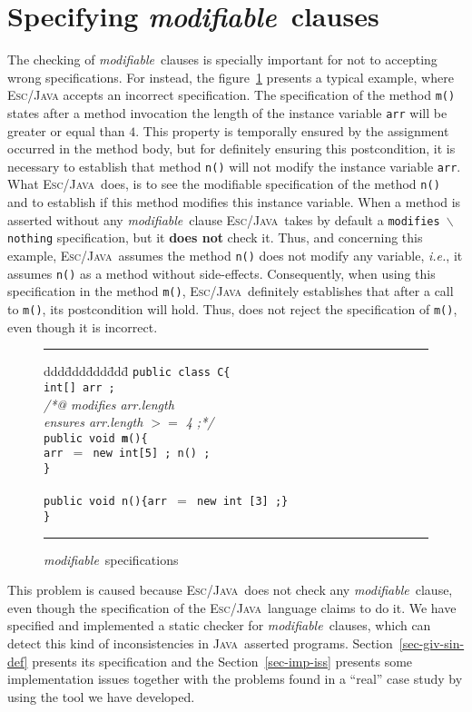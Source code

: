 \documentclass[a4paper]{llncs}
\newcommand{\escj}{\textsc{Esc/Java}}
\newcommand{\java}{\textsc{Java}}
\newcommand{\modif}{\textit{modifiable}}
\begin{document}
\section{Specifying \modif~clauses}
\label{sec-sem-mod-cla}
The checking of \modif~clauses is specially important for not to
accepting wrong specifications. For instead, the
figure~\ref{fig-mod-spe} presents a typical example, where \escj
accepts an incorrect specification. The specification of the method
\texttt{m()} states after a method invocation the length of the
instance variable \texttt{arr} will be greater or equal than $4$. This
property is temporally ensured by the assignment occurred in the
method body, but for definitely ensuring this postcondition, it is
necessary to establish that method \texttt{n()} will not modify the
instance variable \texttt{arr}. What \escj~does, is to see the
modifiable specification of the method \texttt{n()} and to establish
if this method modifies this instance variable. When a method is
asserted without any \modif~clause \escj~takes by default a
\texttt{modifies $\backslash$nothing} specification, but it {\bf does
not} check it. Thus, and concerning this example, \escj~assumes the
method \texttt{n()} does not modify any variable, \emph{i.e.}, it
assumes \texttt{n()} as a method without side-effects. Consequently,
when using this specification in the method \texttt{m()},
\escj~definitely establishes that after a call to \texttt{m()}, its
postcondition will hold. Thus, does not reject the specification of
\texttt{m()}, even though it is incorrect.
\begin{figure}[htb]
\rule{\linewidth}{0.25mm}
\begin{tabbing}
ddd\=ddd\=ddd\=ddd\= \kill 
\texttt{public class C\{} \\
\>\texttt{int[] arr ;} \\
\>\textsl{/*@ modifies arr.length}  \\
\>\>\textsl{ ensures arr.length $>=$ 4 ;*/} \\
\>\texttt{public void {\bf m}()\{} \\
\>\>\texttt{arr $=$ new int[5] ; n() ;} \\
\>\texttt{\}} \\
\\
\>\texttt{public void n()\{arr $=$ new int [3] ;\}} \\
\texttt{\}}
\end{tabbing}
\caption{\modif~specifications} 
\label{fig-mod-spe} 
\rule{\linewidth}{0.25mm} 
\end{figure} 
This problem is caused because \escj~does not check any \modif~clause,
even though the specification of the \escj~language claims to do it. We
have specified and implemented a static checker for \modif~clauses,
which can detect this kind of inconsistencies in \java~asserted
programs. Section~\ref{sec-giv-sin-def} presents its specification
and the Section~\ref{sec-imp-iss} presents some implementation
issues together with the problems found in a ``real'' case study by
using the tool we have developed.
\end{document}
